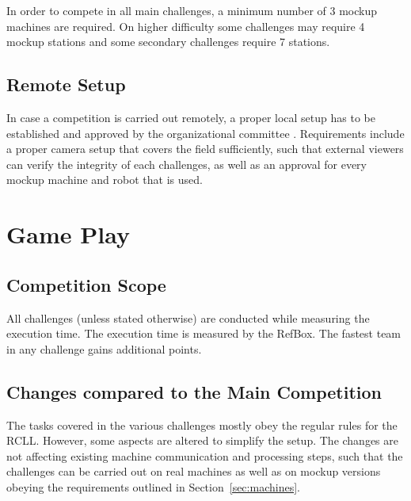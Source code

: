 \documentclass[12pt,twoside]{article}
\newcommand{\refsec}[1]{Section~\ref{#1}}
\begin{document}
In order to compete in all main challenges, a minimum number of 3 mockup
machines are required. On higher difficulty some challenges may require
4 mockup stations and some secondary challenges require 7 stations.

\subsection{Remote Setup}
In case a competition is carried out remotely, a proper local setup has to
be established and approved by the organizational committee
.
Requirements include a proper camera setup that covers the field sufficiently,
such that external viewers can verify the integrity of each challenges,
as well as an approval for every mockup machine and robot that is used.

\section{Game Play}
\subsection{Competition Scope}

All challenges (unless stated otherwise) are conducted while measuring
the execution time. The execution time is measured by the RefBox.
The fastest team in any challenge gains additional points.

\subsection{Changes compared to the Main Competition}
The tasks covered in the various challenges mostly obey the regular rules
for the RCLL. However, some aspects are altered to simplify the setup.
The changes are not affecting existing machine communication and processing
steps, such that the challenges can be carried out on real machines as well as
on mockup versions obeying the requirements outlined in \refsec{sec:machines}.
\end{document}

